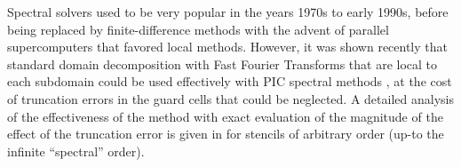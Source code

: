 Spectral solvers used to be very popular in the years 1970s to early 1990s, before being replaced by finite-difference methods with the advent of parallel supercomputers that favored local methods. However, it was shown recently that standard domain decomposition with Fast Fourier Transforms that are local to each subdomain could be used effectively with PIC spectral methods \cite{VayJCP13}, at the cost of truncation errors in the guard cells that could be neglected. A detailed analysis of the effectiveness of the method with exact evaluation of the magnitude of the effect of the truncation error is given in \cite{Vincenti2016a} for stencils of arbitrary order (up-to the infinite ``spectral'' order).
